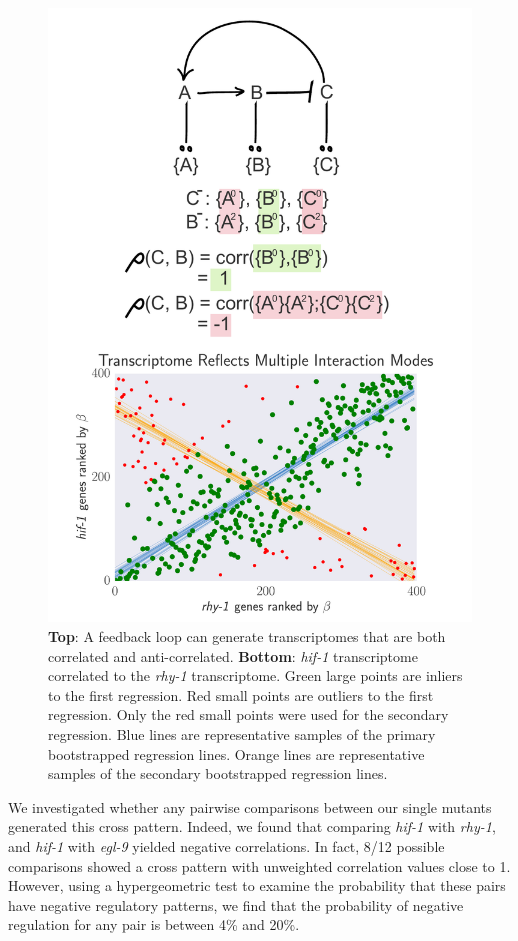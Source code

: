 \documentclass[9pt,twocolumn,twoside]{pnas-new}
\newcommand{\egl}{\emph{egl-9}}
\newcommand{\rhy}{\emph{rhy-1}}
\newcommand{\hif}{\emph{hif-1}}
\begin{document}
\begin{figure}[tbhp]
\centering
\includegraphics[width=.74\linewidth]{figs/correlative_genetics2.pdf}
\caption{\textbf{Top}: A feedback loop can generate transcriptomes that are both correlated and anti-correlated. \textbf{Bottom}: \hif{} transcriptome correlated to the \rhy{} transcriptome. Green large points are inliers to the first regression. Red small points are outliers to the first regression. Only the red small points were used for the secondary regression. Blue lines are representative samples of the primary bootstrapped regression lines. Orange lines are representative samples of the secondary bootstrapped regression lines.}
\label{fig:xpattern}
\end{figure}
We investigated whether any pairwise comparisons between our single mutants generated this cross pattern. Indeed, we found that comparing \hif{} with \rhy{}, and \hif{} with \egl{} yielded negative correlations. In fact, 8/12 possible comparisons showed a cross pattern with unweighted correlation values close to 1. However, using a hypergeometric test to examine the probability that these pairs have negative regulatory patterns, we find that the probability of negative regulation for any pair is between 4\% and 20\%.
\end{document}
